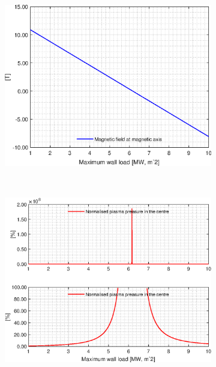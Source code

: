 \begin{figure}[H]
	\begin{subfigure}[b]{.45\textwidth}
		\includegraphics[width=\textwidth]{MatlabFigures/PW/f7.eps}
	\end{subfigure}
	~
	\begin{subfigure}[b]{.45\textwidth}
		\includegraphics[width=\textwidth]{MatlabFigures/PW/f8.eps}
	\end{subfigure}
\end{figure}
